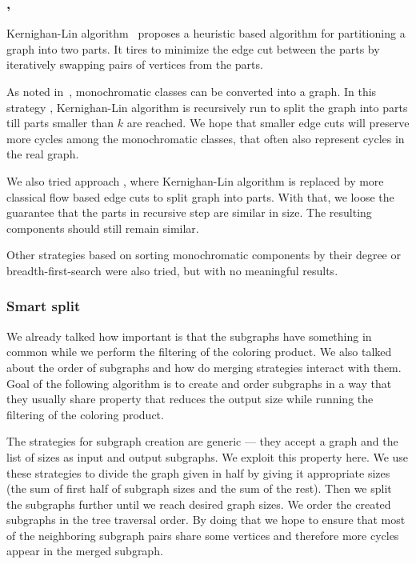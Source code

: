 
\subsubsection{\KernighanLin{}, \Cuts{}}

Kernighan-Lin algorithm~\cite{kernighan_lin} proposes a heuristic based algorithm
for partitioning a graph into two parts. It tires to minimize the edge cut between
the parts by iteratively swapping pairs of vertices from the parts.

As noted in~,
monochromatic classes can be converted into a graph.
In this strategy \KernighanLin{},
Kernighan-Lin algorithm is recursively run to split the graph into parts till
parts smaller than \( k \) are reached.
We hope that smaller edge cuts will preserve more cycles among
the monochromatic classes, that often also represent cycles in the real graph.

We also tried approach \Cuts{}, where Kernighan-Lin algorithm is replaced by
more classical flow based edge cuts to split graph into parts.
With that, we loose the guarantee that the parts in recursive step
are similar in size. The resulting components should still remain similar.

Other strategies based on
sorting monochromatic components by their degree
or breadth-first-search were also tried,
but with no meaningful results.

\subsubsection{Smart split}

We already talked how important is that the subgraphs have something in common
while we perform the filtering of the coloring product. We also talked about the order of
subgraphs and how do merging strategies interact with them.
Goal of the following algorithm is to create and order subgraphs in a way that they usually
share property that reduces the output size while running
the filtering of the coloring product.

The strategies for subgraph creation are generic --- they accept a graph and
the list of sizes as input and output subgraphs. We exploit this property here. We use
these strategies to divide the graph given in half by giving it appropriate
sizes (the sum of first half of subgraph sizes and the sum of the rest).
Then we split the subgraphs further until we reach desired graph sizes.
We order the created subgraphs in the tree traversal order.
By doing that we hope to ensure that most of the neighboring subgraph pairs share
some vertices and therefore more cycles appear in the merged subgraph.

